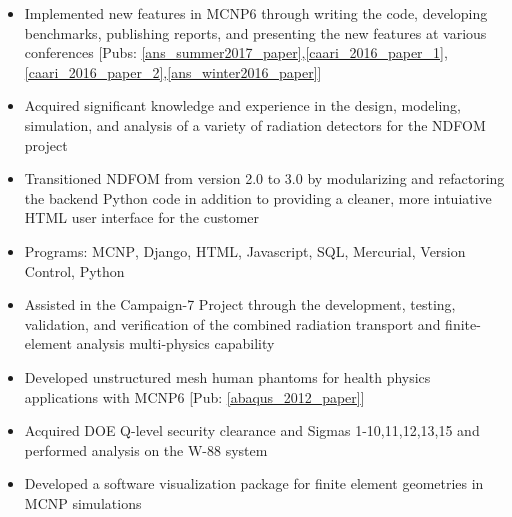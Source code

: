 \begin{minipage}{\textwidth}
    \begin{center}
	\begin{itemize}
	    \item Implemented new features in \textsc{MCNP6} through writing the code, developing benchmarks, publishing reports, and presenting the new features at various conferences [Pubs: \ref{ans_summer2017_paper},\ref{caari_2016_paper_1},\ref{caari_2016_paper_2},\ref{ans_winter2016_paper}]\none 
	    \item Acquired significant knowledge and experience in the design, modeling, simulation, and analysis of a variety of radiation detectors for the NDFOM project\none
	    \item Transitioned NDFOM from version 2.0 to 3.0 by modularizing and refactoring the backend Python code in addition to providing a cleaner, more intuiative HTML user interface for the customer\none
	    \item Programs: \textsc{MCNP}, Django, HTML, Javascript, SQL, Mercurial, Version Control, Python\none
	    \item Assisted in the Campaign-7 Project through the development, testing, validation, and verification of the combined 
			radiation transport and finite-element analysis multi-physics capability\nthree
	    \item Developed unstructured mesh human phantoms for health physics applications with \textsc{MCNP6} [Pub: \ref{abaqus_2012_paper}]\nthree
	    \item Acquired DOE Q-level security clearance and Sigmas 1-10,11,12,13,15 and performed analysis on the W-88 system\nthree
	    \item Developed a software visualization package for finite element geometries in MCNP simulations\nfour
	\end{itemize}
    \end{center}
\end{minipage}


